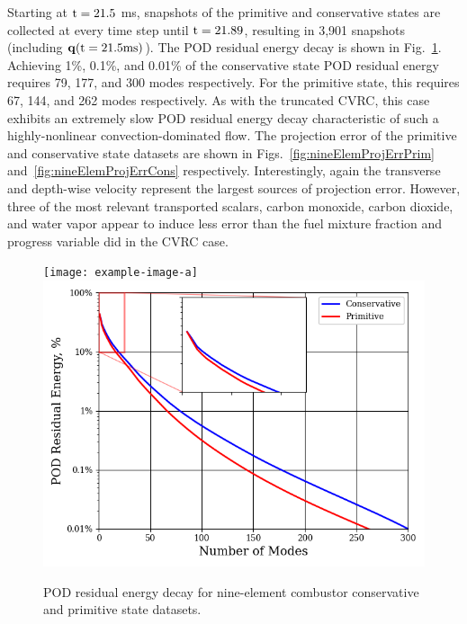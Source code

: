 Starting at $\text{t} = 21.5$ ms, snapshots of the primitive and conservative states are collected at every time step until $\text{t} = 21.89$, resulting in 3,901 snapshots (including $\mathbf{q}(\text{t} = 21.5 \text{ms})$). The POD residual energy decay is shown in Fig.~\ref{fig:nineElemPODEnergy}. Achieving 1\%, 0.1\%, and 0.01\% of the conservative state POD residual energy requires 79, 177, and 300 modes respectively. For the primitive state, this requires 67, 144, and 262 modes respectively. As with the truncated CVRC, this case exhibits an extremely slow POD residual energy decay characteristic of such a highly-nonlinear convection-dominated flow. The projection error of the primitive and conservative state datasets are shown in Figs.~\ref{fig:nineElemProjErrPrim} and~\ref{fig:nineElemProjErrCons} respectively. Interestingly, again the transverse and depth-wise velocity represent the largest sources of projection error. However, three of the most relevant transported scalars, carbon monoxide, carbon dioxide, and water vapor appear to induce less error than the fuel mixture fraction and progress variable did in the CVRC case.

\begin{figure}
	\centering
	\ifdefined\DRAFT
		\texttt{[image: example-image-a]}
	\else
		\includegraphics[width=0.8\linewidth]{Chapters/NineElement/Images/nineElem_pod_energy.png}
	\fi
	\caption{\label{fig:nineElemPODEnergy}POD residual energy decay for nine-element combustor conservative and primitive state datasets.}
\end{figure}

